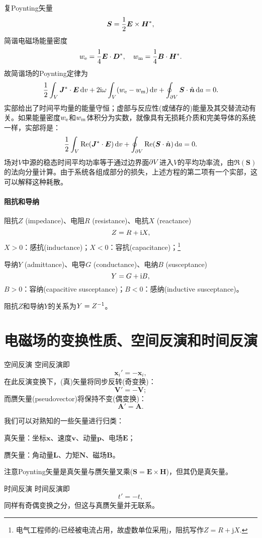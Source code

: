复Poynting矢量
\[
    \bm S=\frac12\bm E\times\bm H^\ast,
\]
简谐电磁场能量密度
\[
    w_\mathrm e=\frac14\bm E\cdot\bm D^\ast,\quad w_\text m=\frac14\bm B\cdot\bm H^\ast.
\]
故简谐场的Poynting定律为
\[
    \frac12\int_V\bm J^\ast\cdot\bm E\mathop{}\!\mathrm{d} v+2\mathrm{i}\omega\int_V(w_\mathrm e-w_\text m)\mathop{}\!\mathrm{d} v+\oint_{\partial V}\bm S\cdot\mathop{}\!\hat{\bm{n}}\mathop{}\!\mathrm{d} a=0.
\]
实部给出了时间平均量的能量守恒；虚部与反应性(或储存的)能量及其交替流动有关。如果能量密度$w_\mathrm e$和$w_\text m$体积分为实数，就像具有无损耗介质和完美导体的系统一样，实部将是：
\[
    \frac12\int_V\operatorname{Re}(\bm J^\ast\cdot\bm E)\mathop{}\!\mathrm{d} v+\oint_{\partial V}\operatorname{Re}(\bm S\cdot\mathop{}\!\hat{\bm{n}})\mathop{}\!\mathrm{d} a=0.
\]
场对$V$中源的稳态时间平均功率等于通过边界面$\partial V$进入$V$的平均功率流，由$\Re(\bm S)$的法向分量计算。由于系统各组成部分的损失，上述方程的第二项有一个实部，这可以解释这种耗散。
\paragraph{阻抗和导纳}
阻抗$Z$ (impedance)、电阻$R$ (resistance)、电抗$X$ (reactance)
\[
    Z=R+\mathrm{i} X,
\]
$X>0$：感抗(inductance)；$X<0$：容抗(capacitance)；\footnote{电气工程师的$i$已经被电流占用，故虚数单位采用j，阻抗写作$Z=R+\mathrm j X.$}

导纳$Y$ (admittance)、电导$G$ (conductance)、电纳$B$ (susceptance)
\[
    Y=G+\mathrm{i} B,
\]
$B>0$：容纳(capacitive susceptance)；$B<0$：感纳(inductive susceptance)。

阻抗$Z$和导纳$Y$的关系为$Y=Z^{-1}$。
\section{电磁场的变换性质、空间反演和时间反演}
\begin{definition}{空间反演}{}
    空间反演即
    \[
        \bm x_i'=-\bm x_i,
    \]
    在此反演变换下，(真)矢量将同步反转(奇变换)：
    \[
        \bm V'=-\bm V;
    \]
    而赝矢量(pseudovector)将保持不变(偶变换)：
    \[
        \bm A'=\bm A.
    \]
\end{definition}
我们可以对熟知的一些矢量进行归类：
\begin{compactitem}
	\item 真矢量：坐标$\bm x$、速度$\bm v$、动量$\bm p$、电场$\bm E$；
	\item 赝矢量：角动量$\bm L$、力矩$\bm N$、磁场$\bm B$。
\end{compactitem}
注意Poynting矢量是真矢量与赝矢量叉乘($\bm S=\bm E\times\bm H$)，但其仍是真矢量。
\begin{definition}{时间反演}{}
    时间反演即
    \[
        t'=-t,
    \]
    同样有奇偶变换之分，但这与真赝矢量并无联系。
\end{definition}

